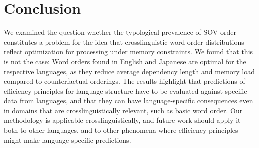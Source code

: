 \documentclass[11pt,a4paper]{article}
\begin{document}
\section{Conclusion}
We examined the question whether the typological prevalence of SOV order constitutes a problem for the idea that crosslinguistic word order distributions reflect optimization for processing under memory constraints.
We found that this is not the case: Word orders found in English and Japanese are optimal for the respective languages, as they reduce average dependency length and memory load compared to counterfactual orderings.
The results highlight that predictions of efficiency principles for language structure have to be evaluated against specific data from languages, and that they can have language-specific consequences even in domains that are crosslinguistically relevant, such as basic word order.
Our methodology is applicable crosslinguistically, and future work should apply it both to other languages, and to other phenomena where efficiency principles might make language-specific predictions.



%
\end{document}
